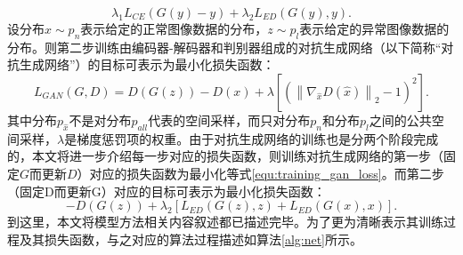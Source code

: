 \begin{equation}
 \lambda_{1} L_{CE}(G(y)-y) + \lambda_{2}L_{ED}(G(y), y).
\end{equation}
\noindent 设分布$x\sim p_n$表示给定的正常图像数据的分布，$z\sim p_l$表示给定的异常图像数据的分布。则第二步训练由编码器-解码器和判别器组成的对抗生成网络（以下简称“对抗生成网络”）的目标可表示为最小化损失函数：
\begin{equation}\label{equ:training_gan_loss}
L_{GAN}(G, D)=D(G(z))-D(x)+\lambda \left[\left(\left\|\nabla_{\hat{x}} D(\hat{x})\right\|_{2}-1\right)^{2}\right].
\end{equation}
其中分布$p_{\hat{x}}$不是对分布$p_{all}$代表的空间采样，而只对分布$p_n$和分布$p_l$之间的公共空间采样，$\lambda$是梯度惩罚项的权重。由于对抗生成网络的训练也是分两个阶段完成的，本文将进一步介绍每一步对应的损失函数，则训练对抗生成网络的第一步（固定$G$而更新$D$）对应的损失函数为最小化等式\ref{equ:training_gan_loss}。而第二步（固定D而更新G）对应的目标可表示为最小化损失函数：
\begin{equation*}
	-D\left(G(z)\right) + \lambda_{2}\left[L_{ED}(G(z), z) + L_{ED}(G(x), x)\right].
\end{equation*}
\noindent 到这里，本文将模型方法相关内容叙述都已描述完毕。为了更为清晰表示其训练过程及其损失函数，与之对应的算法过程描述如算法\ref{alg:net}所示。

